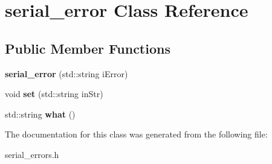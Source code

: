 \hypertarget{classserial__error}{}\section{serial\+\_\+error Class Reference}
\label{classserial__error}
\subsection*{Public Member Functions}
\begin{DoxyCompactItemize}
\item 
{\bfseries serial\+\_\+error} (std\+::string i\+Error)\hypertarget{classserial__error_a3ae41b1a66bf27d6567d3347fd2adb30}{}\label{classserial__error_a3ae41b1a66bf27d6567d3347fd2adb30}

\item 
void {\bfseries set} (std\+::string in\+Str)\hypertarget{classserial__error_a92aecbdfa02bdc978bf570b3ee8921ac}{}\label{classserial__error_a92aecbdfa02bdc978bf570b3ee8921ac}

\item 
std\+::string {\bfseries what} ()\hypertarget{classserial__error_a9415af08376e13d3f2bab5a0c5933d13}{}\label{classserial__error_a9415af08376e13d3f2bab5a0c5933d13}

\end{DoxyCompactItemize}


The documentation for this class was generated from the following file\+:\begin{DoxyCompactItemize}
\item 
serial\+\_\+errors.\+h\end{DoxyCompactItemize}

